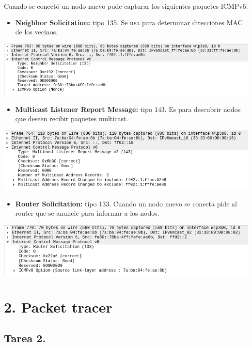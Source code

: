 \documentclass[11pt]{article}
\begin{document}
Cuando se conectó un nodo nuevo pude capturar los siguientes paquetes ICMPv6:
\begin{itemize}
\item \textbf{Neighbor Solicitation:} tipo 135. Se usa para determinar direcciones MAC de los vecinos.
\end{itemize}
\begin{center}
\includegraphics[width=.9\linewidth]{./1ga.png}
\end{center}
\begin{itemize}
\item \textbf{Multicast Listener Report Message:} tipo 143. Es para descubrir nodos que deseen recibir paquetes multicast.
\end{itemize}
\begin{center}
\includegraphics[width=.9\linewidth]{./1gb.png}
\end{center}
\begin{itemize}
\item \textbf{Router Solicitation:} tipo 133. Cuando un nodo nuevo se conecta pide al router que se anuncie para informar a los nodos.
\end{itemize}
\begin{center}
\includegraphics[width=.9\linewidth]{./1gc.png}
\end{center}
\newpage
\section*{2. Packet tracer}
\label{sec:org7801212}
\subsection*{Tarea 2.}
\label{sec:orgce3fb4d}
\end{document}
